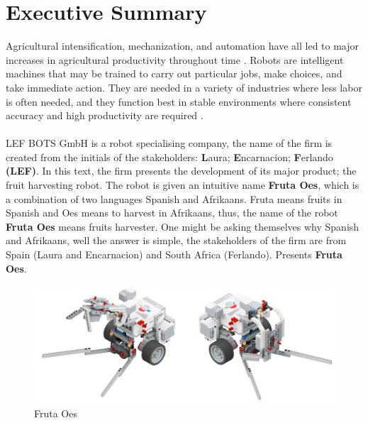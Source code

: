 \section*{Executive Summary}
\noindent Agricultural intensification, mechanization, and automation have all led to major increases in agricultural productivity throughout time \cite{nof2009springer}. Robots are intelligent machines that may be trained to carry out particular jobs, make choices, and take immediate action. They are needed in a variety of industries where less labor is often needed, and they function best in stable environments where consistent accuracy and high productivity are required \cite{nof1999handbook}.\\
~\\
\noindent LEF BOTS GmbH is a robot specialising company, the name of the firm is created from the initials of the stakeholders: \textbf{L}aura; \textbf{E}ncarnacion; \textbf{F}erlando \textbf{(LEF)}. In this text, the firm presents the development of its major product; the fruit harvesting robot. The robot is given an intuitive name \textbf{Fruta Oes}, which is a combination of two languages Spanish and Afrikaans. Fruta means fruits in Spanish and Oes means to harvest in Afrikaans, thus, the name of the robot \textbf{Fruta Oes} means fruits harvester. One might be asking themselves why Spanish and Afrikaans, well the answer is simple, the stakeholders of the firm are from Spain (Laura and Encarnacion) and South Africa (Ferlando).  Presents \textbf{Fruta Oes}.
\begin{figure}[h]
	\centering
	\includegraphics[width=\linewidth]{Graphics/2oppositeViews}
	\caption{Fruta Oes}
	\label{fig:2oppositeviews}
\end{figure}


